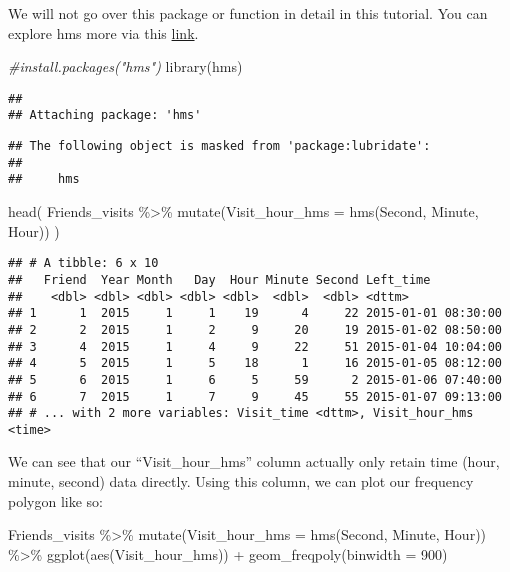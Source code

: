 \documentclass[
]{book}
\newenvironment{Shaded}{\begin{snugshade}}{\end{snugshade}}
\newcommand{\AttributeTok}[1]{\textcolor[rgb]{0.77,0.63,0.00}{#1}}
\newcommand{\CommentTok}[1]{\textcolor[rgb]{0.56,0.35,0.01}{\textit{#1}}}
\newcommand{\DecValTok}[1]{\textcolor[rgb]{0.00,0.00,0.81}{#1}}
\newcommand{\FunctionTok}[1]{\textcolor[rgb]{0.00,0.00,0.00}{#1}}
\newcommand{\NormalTok}[1]{#1}
\newcommand{\SpecialCharTok}[1]{\textcolor[rgb]{0.00,0.00,0.00}{#1}}
\begin{document}
We will not go over this package or function in detail in this tutorial. You can explore hms more via this \href{https://cran.r-project.org/web/packages/hms/hms.pdf}{link}.

\begin{Shaded}
\begin{Highlighting}[]
\CommentTok{\#install.packages("hms")}
\FunctionTok{library}\NormalTok{(hms)}
\end{Highlighting}
\end{Shaded}

\begin{verbatim}
##
## Attaching package: 'hms'
\end{verbatim}

\begin{verbatim}
## The following object is masked from 'package:lubridate':
##
##     hms
\end{verbatim}

\begin{Shaded}
\begin{Highlighting}[]
\FunctionTok{head}\NormalTok{(}
\NormalTok{    Friends\_visits }\SpecialCharTok{\%\textgreater{}\%}
    \FunctionTok{mutate}\NormalTok{(}\AttributeTok{Visit\_hour\_hms =} \FunctionTok{hms}\NormalTok{(Second, Minute, Hour))}
\NormalTok{    )}
\end{Highlighting}
\end{Shaded}

\begin{verbatim}
## # A tibble: 6 x 10
##   Friend  Year Month   Day  Hour Minute Second Left_time
##    <dbl> <dbl> <dbl> <dbl> <dbl>  <dbl>  <dbl> <dttm>
## 1      1  2015     1     1    19      4     22 2015-01-01 08:30:00
## 2      2  2015     1     2     9     20     19 2015-01-02 08:50:00
## 3      4  2015     1     4     9     22     51 2015-01-04 10:04:00
## 4      5  2015     1     5    18      1     16 2015-01-05 08:12:00
## 5      6  2015     1     6     5     59      2 2015-01-06 07:40:00
## 6      7  2015     1     7     9     45     55 2015-01-07 09:13:00
## # ... with 2 more variables: Visit_time <dttm>, Visit_hour_hms <time>
\end{verbatim}

We can see that our ``Visit\_hour\_hms'' column actually only retain time (hour, minute, second) data directly. Using this column, we can plot our frequency polygon like so:

\begin{Shaded}
\begin{Highlighting}[]
\NormalTok{ Friends\_visits }\SpecialCharTok{\%\textgreater{}\%}
    \FunctionTok{mutate}\NormalTok{(}\AttributeTok{Visit\_hour\_hms =} \FunctionTok{hms}\NormalTok{(Second, Minute, Hour)) }\SpecialCharTok{\%\textgreater{}\%}
    \FunctionTok{ggplot}\NormalTok{(}\FunctionTok{aes}\NormalTok{(Visit\_hour\_hms)) }\SpecialCharTok{+}
    \FunctionTok{geom\_freqpoly}\NormalTok{(}\AttributeTok{binwidth =} \DecValTok{900}\NormalTok{)}
\end{Highlighting}
\end{Shaded}
\end{document}
